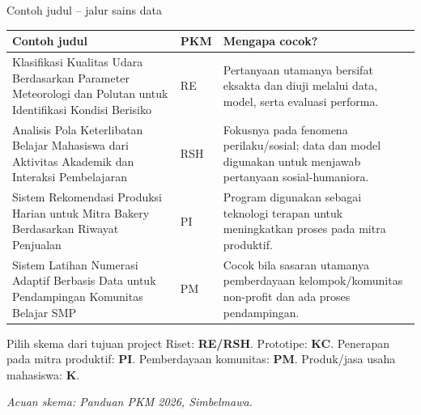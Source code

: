 \documentclass[aspectratio=169,11pt]{beamer}
\begin{document}
\begin{frame}{Contoh judul -- jalur sains data}
\scriptsize
\renewcommand{\arraystretch}{1.22}
\begin{tabularx}{\textwidth}{>{\raggedright\arraybackslash}p{5.8cm} >{\centering\arraybackslash}p{1.45cm} X}
\toprule
\textbf{Contoh judul} & \textbf{PKM} & \textbf{Mengapa cocok?}\\
\midrule
Klasifikasi Kualitas Udara Berdasarkan Parameter Meteorologi dan Polutan untuk Identifikasi Kondisi Berisiko & RE & Pertanyaan utamanya bersifat eksakta dan diuji melalui data, model, serta evaluasi performa.\\
\addlinespace
Analisis Pola Keterlibatan Belajar Mahasiswa dari Aktivitas Akademik dan Interaksi Pembelajaran & RSH & Fokusnya pada fenomena perilaku/sosial; data dan model digunakan untuk menjawab pertanyaan sosial-humaniora.\\
\addlinespace
Sistem Rekomendasi Produksi Harian untuk Mitra Bakery Berdasarkan Riwayat Penjualan & PI & Program digunakan sebagai teknologi terapan untuk meningkatkan proses pada mitra produktif.\\
\addlinespace
Sistem Latihan Numerasi Adaptif Berbasis Data untuk Pendampingan Komunitas Belajar SMP & PM & Cocok bila sasaran utamanya pemberdayaan kelompok/komunitas non-profit dan ada proses pendampingan.\\
\bottomrule
\end{tabularx}
\vspace{1mm}
\begin{alertblock}{Pilih skema dari tujuan project}
\scriptsize Riset: \textbf{RE/RSH}. Prototipe: \textbf{KC}. Penerapan pada mitra produktif: \textbf{PI}. Pemberdayaan komunitas: \textbf{PM}. Produk/jasa usaha mahasiswa: \textbf{K}.
\end{alertblock}
\vspace{-1mm}\scriptsize\textit{Acuan skema: Panduan PKM 2026, Simbelmawa.}
\end{frame}
\end{document}
